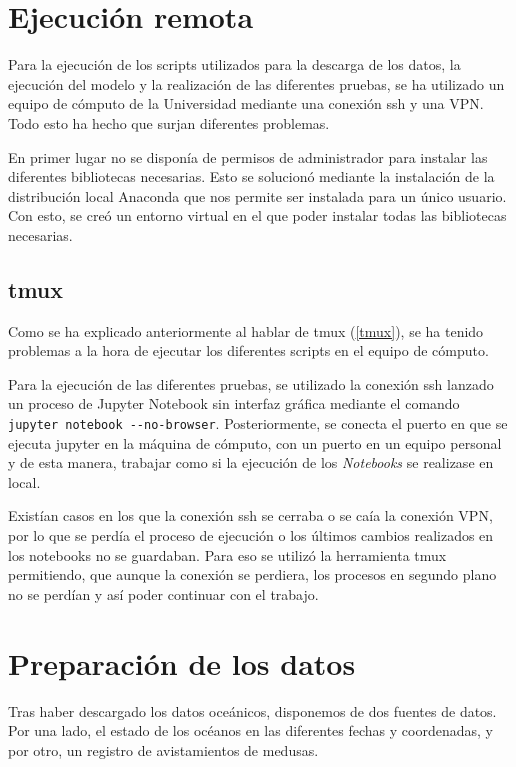 \section{Ejecución remota}
Para la ejecución de los scripts utilizados para la descarga de los datos, la ejecución del modelo y la realización de las diferentes pruebas, se ha utilizado un equipo de cómputo de la Universidad mediante una conexión ssh y una VPN. Todo esto ha hecho que surjan diferentes problemas.

En primer lugar no se disponía de permisos de administrador para instalar las diferentes bibliotecas necesarias. Esto se solucionó mediante la instalación de la distribución local Anaconda que nos permite ser instalada para un único usuario. Con esto, se creó un entorno virtual en el que poder instalar todas las bibliotecas necesarias.

\subsection{tmux}
Como se ha explicado anteriormente al hablar de tmux (\ref{tmux}), se ha tenido problemas a la hora de ejecutar los diferentes scripts en el equipo de cómputo.

Para la ejecución de las diferentes pruebas, se utilizado la conexión ssh lanzado un proceso de Jupyter Notebook sin interfaz gráfica mediante el comando \verb|jupyter notebook --no-browser|. Posteriormente, se conecta el puerto en que se ejecuta jupyter en la máquina de cómputo, con un puerto en un equipo personal y de esta manera, trabajar como si la ejecución de los \emph{Notebooks} se realizase en local.


Existían casos en los que la conexión ssh se cerraba o se caía la conexión VPN, por lo que se perdía el proceso de ejecución o los últimos cambios realizados en los notebooks no se guardaban. Para eso se utilizó la herramienta tmux permitiendo, que aunque la conexión se perdiera, los procesos en segundo plano no se perdían y así poder continuar con el trabajo.

\section{Preparación de los datos}\textsl{}
Tras haber descargado los datos oceánicos, disponemos de dos fuentes de datos. Por una lado, el estado de los océanos en las diferentes fechas y coordenadas, y por otro, un registro de avistamientos de medusas.

